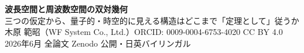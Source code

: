 \documentclass[9pt]{ltjsarticle}
\begin{document}
\begin{minipage}[t]{\textwidth}
\colorbox{accl}{\begin{minipage}{0.992\textwidth}\vspace{2pt}
{\LARGE\bfseries 波長空間と周波数空間の双対幾何}\\[2pt]
{\large 三つの仮定から、量子的・時空的に見える構造はどこまで「定理として」従うか}\\[2pt]
木原 範昭（WF System Co., Ltd.）\quad ORCID: 0009-0004-6753-4020 \quad CC BY 4.0 \quad 2026年6月 \quad 全論文 Zenodo 公開・日英バイリンガル
\vspace{2pt}\end{minipage}}
\end{minipage}
\end{document}
